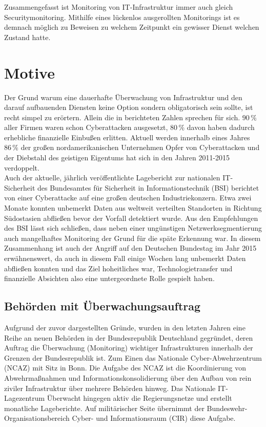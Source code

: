 Zusammengefasst ist Monitoring von IT-Infrastruktur immer auch gleich Securitymonitoring. 
Mithilfe eines lückenlos ausgerollten Monitorings ist es demnach möglich zu Beweisen zu 
welchem Zeitpunkt ein gewisser Dienst welchen Zustand hatte.
 
\section{Motive}

Der Grund warum eine dauerhafte Überwachung von Infrastruktur und den darauf aufbauenden 
Diensten keine Option sondern obligatorisch sein sollte, ist recht simpel zu erörtern. 
Allein die in \cite[461]{francia} berichteten Zahlen sprechen für sich. $90\,\%$ aller 
Firmen waren schon Cyberattacken ausgesetzt, $80\,\%$ davon haben dadurch erhebliche 
finanzielle Einbußen erlitten. Aktuell werden innerhalb eines Jahres $86\,\%$ der großen 
nordamerikanischen Unternehmen Opfer von Cyberattacken und der Diebstahl des geistigen 
Eigentums hat sich in den Jahren 2011-2015 verdoppelt.\\
Auch der aktuelle, jährlich veröffentlichte Lagebericht zur nationalen IT-Sicherheit des
Bundesamtes für Sicherheit in Informationstechnik (BSI) \cite[12]{bsi-lage} berichtet  
von einer Cyberattacke auf eine großen deutschen Industriekonzern. Etwa zwei Monate 
konnten unbemerkt Daten aus weltweit verteilten Standorten in Richtung Südostasien 
abfließen bevor der Vorfall detektiert wurde. Aus den Empfehlungen des BSI lässt sich 
schließen, dass neben einer ungünstigen Netzwerksegmentierung auch mangelhaftes Monitoring
der Grund für die späte Erkennung war. In diesem Zusammenhang ist auch der Angriff auf 
den Deutschen Bundestag im Jahr 2015 erwähnenswert, da auch in diesem Fall einige Wochen 
lang unbemerkt Daten abfließen konnten und das Ziel hoheitliches war, 
Technologietransfer und finanzielle Absichten also eine untergeordnete Rolle gespielt 
haben.
\newpage
\subsection{Behörden mit Überwachungsauftrag}

Aufgrund der zuvor dargestellten Gründe, wurden in den letzten Jahren eine Reihe an neuen 
Behörden in der Bundesrepublik Deutschland gegründet, deren Auftrag die Überwachung 
(Monitoring) wichtiger Infrastrukturen innerhalb der Grenzen der Bundesrepublik ist. Zum 
Einen das Nationale Cyber-Abwehrzentrum (NCAZ) \cite{ncaz} mit Sitz in Bonn. Die Aufgabe 
des NCAZ ist 
die Koordinierung von Abwehrmaßnahmen und Informationskonsolidierung über den Aufbau von 
rein ziviler Infrastruktur über mehrere Behörden hinweg. Das Nationale IT-Lagezentrum 
\cite{lagezentrum} 
Überwacht hingegen aktiv die Regierungsnetze und erstellt monatliche Lageberichte. Auf 
militärischer Seite übernimmt der Bundeswehr-Organisationsbereich Cyber- und 
Informationsraum (CIR) diese Aufgabe.

